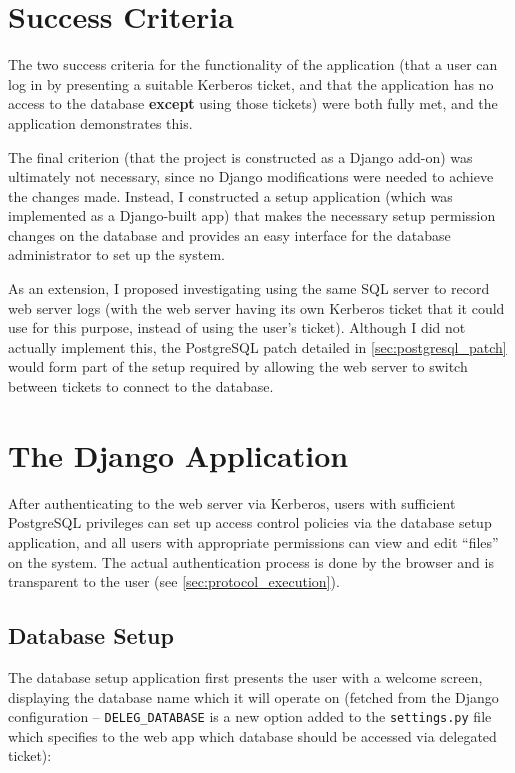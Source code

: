 \documentclass[12pt]{report}
\begin{document}
\section{Success Criteria}
The two success criteria for the functionality of the application (that a user can log in by presenting a suitable Kerberos ticket, and that the application has no access to the database \textbf{except} using those tickets) were both fully met, and the application demonstrates this.

The final criterion (that the project is constructed as a Django add-on) was ultimately not necessary, since no Django modifications were needed to achieve the changes made. Instead, I constructed a setup application (which was implemented as a Django-built app) that makes the necessary setup permission changes on the database and provides an easy interface for the database administrator to set up the system.

As an extension, I proposed investigating using the same SQL server to record web server logs (with the web server having its own Kerberos ticket that it could use for this purpose, instead of using the user's ticket). Although I did not actually implement this, the PostgreSQL patch detailed in \autoref{sec:postgresql_patch} would form part of the setup required by allowing the web server to switch between tickets to connect to the database.

\section{The Django Application}
After authenticating to the web server via Kerberos, users with sufficient PostgreSQL privileges can set up access control policies via the database setup application, and all users with appropriate permissions can view and edit ``files'' on the system. The actual authentication process is done by the browser and is transparent to the user (see \autoref{sec:protocol_execution}).

\subsection{Database Setup}
The database setup application first presents the user with a welcome screen, displaying the database name which it will operate on (fetched from the Django configuration -- \verb+DELEG_DATABASE+ is a new option added to the \verb+settings.py+ file which specifies to the web app which database should be accessed via delegated ticket):
\end{document}
